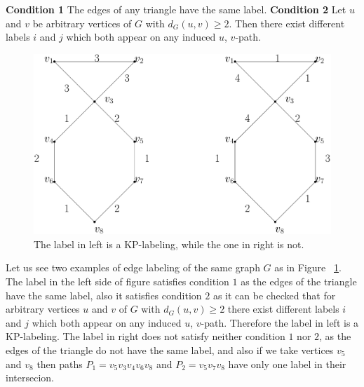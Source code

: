 \documentclass[12pt,a4paper,titlepage,openany]{report}
\begin{document}
\textbf{Condition 1} The edges of any triangle have the same label.\newline
\textbf{Condition 2} Let $u$ and $v$ be arbitrary vertices of $G$ with $d_G(u,v) \geq 2$. Then there exist different labels $i$ and $j$ which both appear on any induced $u$, $v$-path.\newline
\begin{figure}[h!]\label{kpexample}
\begin{center}
\includegraphics[width=1\linewidth]{figures/kpexample.png}
\end{center}
\caption{The label in left is a KP-labeling, while the one in right is not.}
\end{figure}
\begin{example}
Let us see two examples of edge labeling of the same graph $G$ as in Figure ~\ref{kpexample}.\newline
The label in the left side of figure satisfies condition $1$ as the edges of the triangle have the same label, also it satisfies condition $2$ as it can be checked that for arbitrary vertices $u$ and $v$ of $G$ with $d_G(u,v) \geq 2$ there exist different labels $i$ and $j$ which both appear on any induced $u$, $v$-path. Therefore the label in left is a KP-labeling.\newline
The label in right does not satisfy neither condition $1$ nor $2$, as the edges of the triangle do not have the same label, and also if we take vertices $v_5$ and $v_8$ then paths $P_1=v_5v_3v_4v_6v_8$ and $P_2=v_5v_7v_8$ have only one label in their intersecion.
\end{example}
\end{document}
